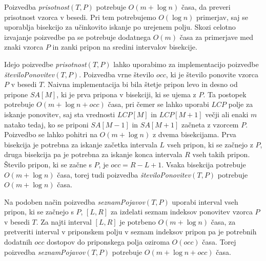 Poizvedba \textit{prisotnost}$(T,P)$ potrebuje $O(m+\log{n})$ časa, da preveri prisotnost vzorca v besedi. Pri tem potrebujemo $O(\log{n})$ primerjav, saj se uporablja bisekcijo za učinkovito iskanje po urejenem polju. Skozi celotno izvajanje poizvedbe pa se potrebuje dodatnega $O(m)$ časa za primerjave med znaki vzorca $P$ in zanki pripon na sredini intervalov bisekcije.


Idejo poizvedbe \textit{prisotnost}$(T,P)$ lahko uporabimo za implementacijo poizvedbe \textit{številoPonovitev}$(T,P)$. Poizvedba vrne število $occ$, ki je število ponovite vzorca $P$ v besedi $T$. Naivna implementacija bi bila štetje pripon levo in desno od pripone $SA[M]$, ki je prva pripona v bisekciji, ki se ujema z $P$. Ta postopek potrebuje $O(m + \log{n}+occ)$ časa, pri čemer se lahko uporabi $LCP$ polje za iskanje ponovitev, saj sta vrednosti $LCP[M]$ in $LCP[M+1]$ večji ali enaki $m$ natako tedaj, ko se priponi $SA[M-1]$ in $SA[M+1]$ začneta z vzorcem $P$. Poizvedbo se lahko pohitri na $O(m + \log{n})$ z dvema bisekcijama. Prva bisekcija je potrebna za iskanje začetka intervala $L$ vseh pripon, ki se začnejo z $P$, druga bisekcija pa je potrebna za iskanje konca intervala $R$ vseh takih pripon. Število pripon, ki se začne s $P$, je $occ=R-L+1$. Vsaka bisekcija potrebuje $O(m+\log{n})$ časa, torej tudi poizvedba \textit{številoPonovitev}$(T,P)$ potrebuje $O(m+\log{n})$ časa.

Na podoben način poizvedba \textit{seznamPojavov}$(T,P)$ uporabi interval vseh pripon, ki se začnejo s $P$, $[L,R]$ za izdelati seznam indeksov ponovitev vzorca $P$ v besedi $T$. Za najti interval $[L,R]$ je potrbeno $O(m+\log{n})$ časa, za pretveriti interval v priponskem polju v seznam indeksov pripon pa je potrebnih dodatnih $occ$ dostopov do priponskega polja oziroma $O(occ)$ časa. Torej poizvedba \textit{seznamPojavov}$(T,P)$ potrebuje $O(m+\log{n}+occ)$ časa.


